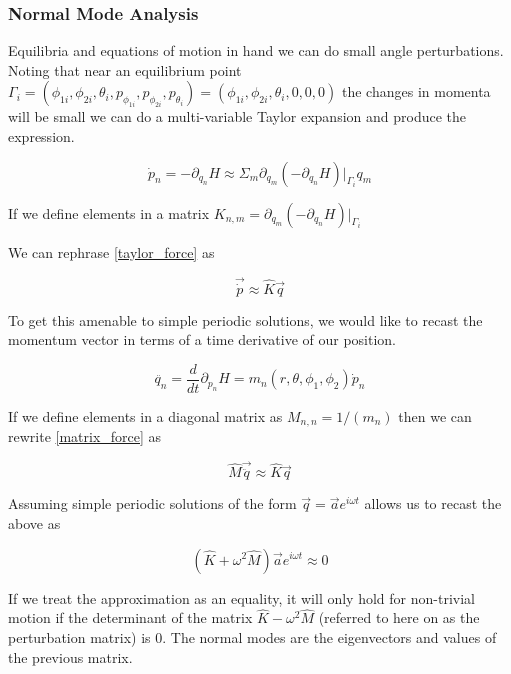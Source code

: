 \documentclass[prb,preprint]{revtex4-1}
\begin{document}
\subsubsection{Normal Mode Analysis}
Equilibria and equations of motion in hand we can do small angle perturbations. Noting that near an equilibrium point 
$\Gamma_i = 
(
\phi_{1i},\phi_{2i},\theta_{i},
p_{\phi_{1i}},p_{\phi_{2i}},p_{\theta_{i}}
)
=
(\phi_{1i},\phi_{2i},\theta_{i},0,0,0)
$ 
the changes in momenta will be small we can do a multi-variable Taylor expansion and produce the expression.

\begin{equation}\label{taylor_force}
	\dot p_n 
	=
	-\partial_{q_n}H
	\approx 
	\Sigma_m \partial_{q_m}(-\partial_{q_n} H)|_{\Gamma_i} q_m 
\end{equation}

If we define elements in a matrix 
$K_{n,m}= \partial_{q_m}(-\partial_{q_n} H)|_{\Gamma_i}$

We can rephrase \ref{taylor_force} as 

\begin{equation} \label{matrix_force}
	\vec{ \dot{ p }} \approx \widehat K \vec q
\end{equation}

To get this amenable to simple periodic solutions, we would like to recast the momentum vector in terms of a time derivative of our position.

\begin{equation}
	\ddot{ q_n } =\frac{d}{dt} \partial_{p_n} H = m_n(r,\theta,\phi_1, \phi_2) \dot p_n
\end{equation}

If we define elements in a diagonal matrix as 
$M_{n,n}=1/(m_n)$
then we can rewrite \ref{matrix_force} as 

\begin{equation}
	\widehat M \vec{ \ddot{ q }} \approx \widehat K \vec q
\end{equation}

Assuming simple periodic solutions of the form $\vec q = \vec a e^{i\omega t}$ allows us to recast the above as

\begin{equation}
	( 
	\widehat K + \omega^2 \widehat M
	)  \vec{ a}e^{i\omega t} \approx 0
\end{equation}

If we treat the approximation as an equality, it will only hold for non-trivial motion if the determinant of the matrix $\widehat K - \omega^2 \widehat M$ (referred to here on as the perturbation matrix) is 0. The normal modes are the eigenvectors and values of the previous matrix.
\end{document}
